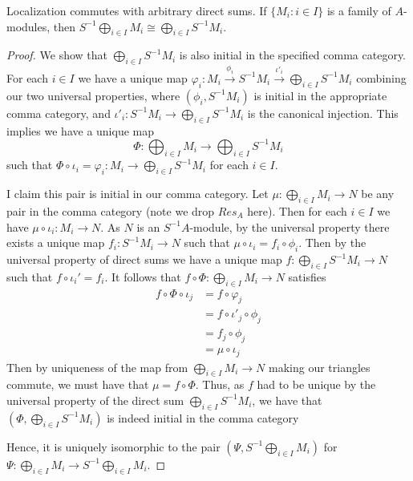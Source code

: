 \begin{claim}
    Localization commutes with arbitrary direct sums. If $\{M_i:i \in I\}$ is a family of $A$-modules, then $S^{-1}\bigoplus_{i \in I}M_i \cong \bigoplus_{i \in I}S^{-1}M_i$.
\end{claim}
\begin{proof}
    We show that $\bigoplus_{i \in I}S^{-1}M_i$ is also initial in the specified comma category. For each $i \in I$ we have a unique map $\varphi_i:M_i\xrightarrow{\phi_i} S^{-1}M_i\xrightarrow{\iota'_i} \bigoplus_{i\in I}S^{-1}M_i$ combining our two universal properties, where $(\phi_i,S^{-1}M_i)$ is initial in the appropriate comma category, and $\iota'_i:S^{-1}M_i\rightarrow \bigoplus_{i \in I}S^{-1}M_i$ is the canonical injection. This implies we have a unique map $$\Phi:\bigoplus_{i \in I}M_i\rightarrow \bigoplus_{i \in I}S^{-1}M_i$$
    such that $\Phi\circ \iota_i = \varphi_i:M_i\rightarrow \bigoplus_{i\in I}S^{-1}M_i$ for each $i \in I$.

    I claim this pair is initial in our comma category. Let $\mu:\bigoplus_{i\in I}M_i\rightarrow N$ be any pair in the comma category (note we drop $Res_A$ here). Then for each $i \in I$ we have $\mu\circ \iota_i:M_i\rightarrow N$. As $N$ is an $S^{-1}A$-module, by the universal property there exists a unique map $f_i:S^{-1}M_i\rightarrow N$ such that $\mu\circ \iota_i = f_i \circ \phi_i$. Then by the universal property of direct sums we have a unique map $f:\bigoplus_{i\in I}S^{-1}M_i\rightarrow N$ such that $f\circ \iota_i' = f_i$. It follows that $f\circ \Phi:\bigoplus_{i \in I}M_i\rightarrow N$ satisfies \begin{align*}
        f\circ \Phi\circ \iota_j &= f\circ  \varphi_j \tag{as $\Phi\circ \iota_j = \varphi_j$} \\
        &= f\circ \iota'_j\circ \phi_j \tag{as $\varphi_j := \iota'_j \circ \phi_j$} \\
        &= f_j\circ \phi_j \\
        &= \mu\circ \iota_j
    \end{align*}
    Then by uniqueness of the map from $\bigoplus_{i \in I}M_i\rightarrow N$ making our triangles commute, we must have that $\mu = f\circ \Phi$. Thus, as $f$ had to be unique by the universal property of the direct sum $\bigoplus_{i \in I}S^{-1}M_i$, we have that $\left(\Phi,\bigoplus_{i \in I}S^{-1}M_i\right)$ is indeed initial in the comma category 
    \begin{center}
\end{center}
    Hence, it is uniquely isomorphic to the pair $\left(\Psi,S^{-1}\bigoplus_{i \in I}M_i\right)$ for $\Psi:\bigoplus_{i \in I}M_i\rightarrow S^{-1}\bigoplus_{i \in I}M_i$.
\end{proof}

